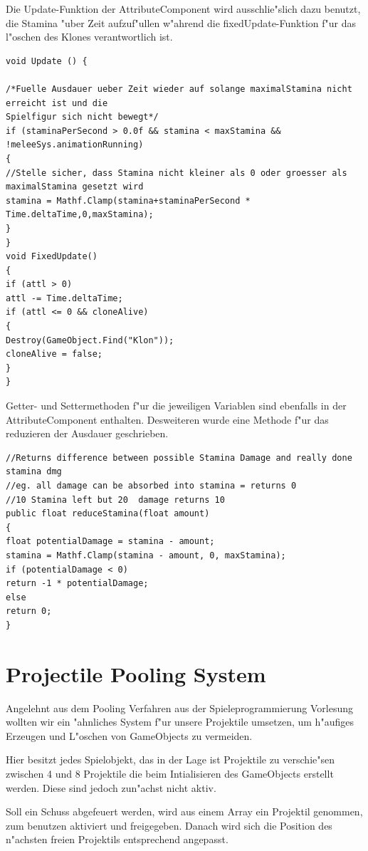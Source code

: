 Die Update-Funktion der AttributeComponent wird ausschlie"slich dazu benutzt, die Stamina "uber Zeit aufzuf"ullen w"ahrend die fixedUpdate-Funktion f"ur das l"oschen des Klones verantwortlich ist.
\begin{lstlisting}[breaklines=true]
void Update () {

/*Fuelle Ausdauer ueber Zeit wieder auf solange maximalStamina nicht erreicht ist und die
Spielfigur sich nicht bewegt*/
if (staminaPerSecond > 0.0f && stamina < maxStamina && !meleeSys.animationRunning)
{
//Stelle sicher, dass Stamina nicht kleiner als 0 oder groesser als maximalStamina gesetzt wird
stamina = Mathf.Clamp(stamina+staminaPerSecond * Time.deltaTime,0,maxStamina);
}   
}
void FixedUpdate()
{
if (attl > 0)
attl -= Time.deltaTime;
if (attl <= 0 && cloneAlive)
{
Destroy(GameObject.Find("Klon"));
cloneAlive = false; 
}
}
\end{lstlisting}

Getter- und Settermethoden f"ur die jeweiligen Variablen sind ebenfalls in der AttributeComponent enthalten.
Desweiteren wurde eine Methode f"ur das reduzieren der Ausdauer geschrieben.
\begin{lstlisting}[breaklines=true]
//Returns difference between possible Stamina Damage and really done stamina dmg
//eg. all damage can be absorbed into stamina = returns 0
//10 Stamina left but 20  damage returns 10
public float reduceStamina(float amount)
{
float potentialDamage = stamina - amount;
stamina = Mathf.Clamp(stamina - amount, 0, maxStamina);
if (potentialDamage < 0)
return -1 * potentialDamage;
else
return 0;
}
\end{lstlisting}

\section{Projectile Pooling System}
Angelehnt aus dem Pooling Verfahren aus der Spieleprogrammierung Vorlesung wollten wir ein "ahnliches System f"ur unsere Projektile umsetzen, um h"aufiges Erzeugen und L"oschen von GameObjects zu vermeiden.

Hier besitzt jedes Spielobjekt, das in der Lage ist Projektile zu verschie"sen zwischen 4 und 8 Projektile die beim Intialisieren des GameObjects erstellt werden. Diese sind jedoch zun"achst nicht aktiv.

Soll ein Schuss abgefeuert werden, wird aus einem Array ein Projektil genommen, zum benutzen aktiviert und freigegeben. Danach wird sich die Position des n"achsten freien Projektils entsprechend angepasst.

